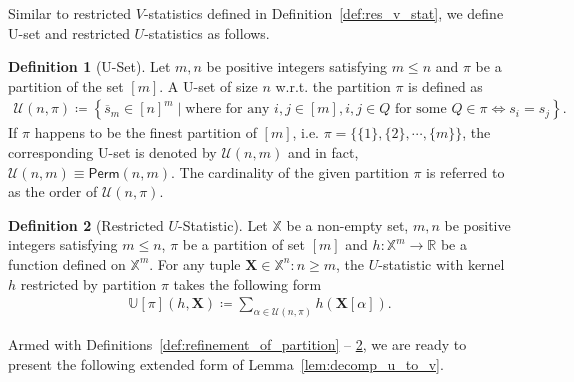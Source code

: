 \documentclass[sn-mathphys, natbib=false]{sn-jnl}
\theoremstyle{plain}
\theoremstyle{definition}
\newtheorem{definition}{Definition}
\newcommand{\sPi}{\pi}
\newcommand{\uset}{\calU}
\newcommand{\usetnm}[2]{\uset\left(#1,#2\right)}
\newcommand{\ustat}{\mathbb{U}}
\newcommand{\perm}[1]{\mathsf{Perm}(#1)}
\newcommand{\bbR}{{\mathbb{R}}}
\def\bbX{\mathbb{X}}
\def\calU{\mathcal{U}}
\begin{document}
\begin{bibunit}[agsm]
Similar to restricted $V$-statistics defined in Definition~\ref{def:res_v_stat}, we define U-set and restricted $U$-statistics as follows. 

\begin{definition}[U-Set]\label{def:u_set}
Let $m,n$ be positive integers satisfying $m \leq n$ and $\sPi$ be a partition of the set $[m]$. A U-set of size $n$ w.r.t. the partition $\sPi$ is defined as
    \begin{align*}
        \usetnm{n}{\sPi} \coloneqq \left\{ \overline{s}_m \in [n]^m \mid \text{where for any $i, j \in [m]$}, i, j \in Q \text{ for some $Q \in \sPi$} \iff   s_i = s_j \right\}.
    \end{align*}
    If $\sPi$ happens to be the finest partition of $[m]$, i.e. $\sPi = \{\{1\}, \{2\}, \cdots, \{m\}\}$, the corresponding U-set is denoted by $\uset(n,m)$ and in fact, $\uset(n,m) \equiv \perm{n,m}$. The cardinality of the given partition $\sPi$ is referred to as the order of $\usetnm{n}{\sPi}$.
\end{definition}

\begin{definition}[Restricted $U$-Statistic]\label{def:res_u_stats}
    Let $\bbX$ be a non-empty set, $m, n$ be positive integers satisfying $m \leq n$, $\sPi$ be a partition of set $[m]$ and $h: \bbX^{m} \rightarrow \bbR$ be a function defined on $\bbX^m$. For any tuple $\bm{X} \in \bbX^n: n \geq m$, the $U$-statistic with kernel $h$ restricted by partition $\sPi$ takes the following form 
    \begin{align*}
        \ustat[\pi](h, \bm{X}) \coloneqq \sum_{\alpha \in \uset(n,\pi)} h(\bm{X}[\alpha]). 
    \end{align*}
\end{definition}

Armed with Definitions~\ref{def:refinement_of_partition} -- \ref{def:res_u_stats}, we are ready to present the following extended form of Lemma~\ref{lem:decomp_u_to_v}. 


\end{bibunit}
\end{document}

